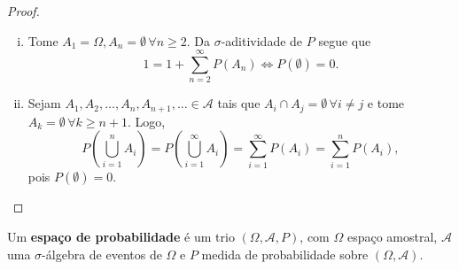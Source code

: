 \documentclass[../Notas.tex]{subfiles}
\begin{document}
\begin{proof}
\begin{enumerate}[(i)]
    \item Tome $A_1 = \Omega, A_n = \emptyset \, \forall n\geq 2$. Da $\sigma$-aditividade de $P$ segue que
    $$
    1 = 1 + \sum_{n=2}^{\infty}P(A_n) \Longleftrightarrow P(\emptyset) = 0.
    $$
    \item Sejam $A_1, A_2, \dots, A_n, A_{n+1}, \dots \in\mathcal{A}$ tais que $A_i\cap A_j = \emptyset \, \forall i\neq j$ e tome $A_k = \emptyset \, \forall k\geq n+1$. Logo, 
    $$
    P\left( \bigcup_{i=1}^{n}A_i \right) = P\left( \bigcup_{i=1}^{\infty}A_i \right) = \sum_{i=1}^{\infty}P(A_i) = \sum_{i=1}^{n}P(A_i),
    $$
    pois $P(\emptyset) = 0$.
\end{enumerate}
\end{proof}

\begin{definition}
Um {\bf espaço de probabilidade} é um trio $(\Omega, \mathcal{A}, P)$, com $\Omega$ espaço amostral, $\mathcal{A}$ uma $\sigma$-álgebra de eventos de $\Omega$ e $P$ medida de probabilidade sobre $(\Omega, \mathcal{A})$.
\end{definition}
\end{document}
